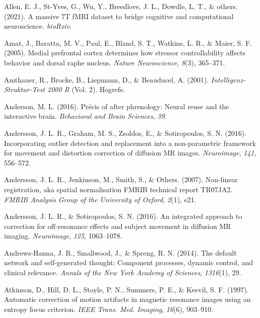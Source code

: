 \documentclass[11pt,american,a4paper,oneside,]{memoir} %
\begin{document}
\leavevmode\hypertarget{ref-Allen2021-zd}{}%
Allen, E. J., St-Yves, G., Wu, Y., Breedlove, J. L., Dowdle, L. T., \& others. (2021). A massive 7T fMRI dataset to bridge cognitive and computational neuroscience. \emph{bioRxiv}.

\leavevmode\hypertarget{ref-amat2005medial}{}%
Amat, J., Baratta, M. V., Paul, E., Bland, S. T., Watkins, L. R., \& Maier, S. F. (2005). Medial prefrontal cortex determines how stressor controllability affects behavior and dorsal raphe nucleus. \emph{Nature Neuroscience}, \emph{8}(3), 365--371.

\leavevmode\hypertarget{ref-Amthauer2001-yg}{}%
Amthauer, R., Brocke, B., Liepmann, D., \& Beauducel, A. (2001). \emph{Intelligenz-Struktur-Test 2000 R} (Vol. 2). Hogrefe.

\leavevmode\hypertarget{ref-anderson2016precis}{}%
Anderson, M. L. (2016). Précis of after phrenology: Neural reuse and the interactive brain. \emph{Behavioral and Brain Sciences}, \emph{39}.

\leavevmode\hypertarget{ref-Andersson2016-nm}{}%
Andersson, J. L. R., Graham, M. S., Zsoldos, E., \& Sotiropoulos, S. N. (2016). Incorporating outlier detection and replacement into a non-parametric framework for movement and distortion correction of diffusion MR images. \emph{Neuroimage}, \emph{141}, 556--572.

\leavevmode\hypertarget{ref-Andersson2007-st}{}%
Andersson, J. L. R., Jenkinson, M., Smith, S., \& Others. (2007). Non-linear registration, aka spatial normalisation FMRIB technical report TR07JA2. \emph{FMRIB Analysis Group of the University of Oxford}, \emph{2}(1), e21.

\leavevmode\hypertarget{ref-Andersson2016-pg}{}%
Andersson, J. L. R., \& Sotiropoulos, S. N. (2016). An integrated approach to correction for off-resonance effects and subject movement in diffusion MR imaging. \emph{Neuroimage}, \emph{125}, 1063--1078.

\leavevmode\hypertarget{ref-andrews2014default}{}%
Andrews-Hanna, J. R., Smallwood, J., \& Spreng, R. N. (2014). The default network and self-generated thought: Component processes, dynamic control, and clinical relevance. \emph{Annals of the New York Academy of Sciences}, \emph{1316}(1), 29.

\leavevmode\hypertarget{ref-Atkinson1997-eu}{}%
Atkinson, D., Hill, D. L., Stoyle, P. N., Summers, P. E., \& Keevil, S. F. (1997). Automatic correction of motion artifacts in magnetic resonance images using an entropy focus criterion. \emph{IEEE Trans. Med. Imaging}, \emph{16}(6), 903--910.
\end{document}
